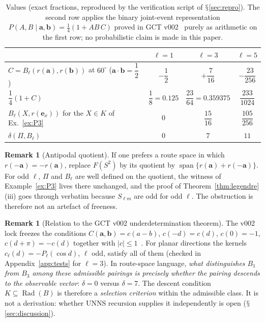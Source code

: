 \documentclass[11pt,a4paper]{article}
\renewcommand{\S}{\ensuremath{\mathsection}}
\newcommand{\Rad}{\operatorname{Rad}}
\newcommand{\spn}{\operatorname{span}}
\newcommand{\defic}{\delta}
\theoremstyle{plain}
\theoremstyle{definition}
\newtheorem{remark}[theorem]{Remark}
\begin{document}
\begin{table}[t]
\centering\small
\renewcommand{\arraystretch}{1.55}
\begin{tabular}{@{}lccc@{}}
\toprule
 & $\ell=1$ & $\ell=3$ & $\ell=5$\\
\midrule
$C=B_\ell(r(\mathbf a),r(\mathbf b))$ at $60^\circ$ ($\mathbf a\!\cdot\!\mathbf b=\dfrac12$) & $-\dfrac12$ & $+\dfrac7{16}$ & $-\dfrac{23}{256}$\\
$\dfrac14(1+C)$ & $\dfrac18=0.125$ & $\dfrac{23}{64}=0.359375$ & $\dfrac{233}{1024}$\\
$B_\ell(X,r(\mathbf e_x))$ for the $X\in K$ of Ex.~\ref{ex:P3} & $0$ & $\dfrac{15}{16}$ & $\dfrac{105}{256}$\\
$\defic(\Pi,B_\ell)$ & $0$ & $7$ & $11$\\
\bottomrule
\end{tabular}
\caption{Values (exact fractions, reproduced by the verification script of \S\ref{sec:repro}). The second row applies the binary joint-event representation $P(A,B\mid\mathbf a,\mathbf b)=\tfrac14(1+AB\,C)$ proved in GCT v002~\cite{G2} purely as arithmetic on the first row; no probabilistic claim is made in this paper.}\label{tab:legendre}
\end{table}

\begin{remark}[Antipodal quotient]
If one prefers a route space in which $r(-\mathbf a)=-r(\mathbf a)$, replace $F(S^2)$ by its quotient by $\spn\{r(\mathbf a)+r(-\mathbf a)\}$. For odd $\ell$, $\Pi$ and $B_\ell$ are well defined on the quotient, the witness of Example~\ref{ex:P3} lives there unchanged, and the proof of Theorem~\ref{thm:legendre}(iii) goes through verbatim because $S_{\ell m}$ are odd for odd $\ell$. The obstruction is therefore not an artefact of freeness.
\end{remark}

\begin{remark}[Relation to the GCT v002 underdetermination theorem]\label{rem:gct}
The v002 lock freezes the conditions $C(\mathbf a,\mathbf b)=c(a-b)$, $c(-d)=c(d)$, $c(0)=-1$, $c(d+\pi)=-c(d)$ together with $|c|\le1$~\cite{G8,G2}. For planar directions the kernels $c_\ell(d)=-P_\ell(\cos d)$, $\ell$ odd, satisfy all of them (checked in Appendix~\ref{app:tests} for $\ell=3$). In route-space language, \emph{what distinguishes $B_1$ from $B_3$ among these admissible pairings is precisely whether the pairing descends to the observable vector}: $\defic=0$ versus $\defic=7$. The descent condition $K\subseteq\Rad(B)$ is therefore a \emph{selection criterion} within the admissible class. It is not a derivation: whether UNNS recursion supplies it independently is open (\S\ref{sec:discussion}).
\end{remark}
\end{document}
